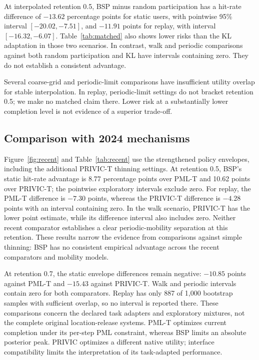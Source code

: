 \documentclass[3p,times]{elsarticle}
\begin{document}
At interpolated retention 0.5, BSP minus random participation has a hit-rate difference of $-13.62$ percentage points for static users, with pointwise 95\% interval $[-20.02,-7.51]$, and $-11.91$ points for replay, with interval $[-16.32,-6.07]$. Table~\ref{tab:matched} also shows lower risks than the KL adaptation in those two scenarios. In contrast, walk and periodic comparisons against both random participation and KL have intervals containing zero. They do not establish a consistent advantage.

Several coarse-grid and periodic-limit comparisons have insufficient utility overlap for stable interpolation. In replay, periodic-limit settings do not bracket retention 0.5; we make no matched claim there. Lower risk at a substantially lower completion level is not evidence of a superior trade-off.

\begin{table}[tbp]
\centering\small
\caption{Exploratory interpolation at retention 0.5. Hit rates and differences are in percentage points. Paired cluster-bootstrap intervals are pointwise. All displayed comparisons have 1,000 valid overlapping resamples.}
\label{tab:matched}
\end{table}

\subsection{Comparison with 2024 mechanisms}
Figure~\ref{fig:recent} and Table~\ref{tab:recent} use the strengthened policy envelopes, including the additional PRIVIC-T thinning settings. At retention 0.5, BSP's static hit-rate advantage is 8.77 percentage points over PML-T and 10.62 points over PRIVIC-T; the pointwise exploratory intervals exclude zero. For replay, the PML-T difference is $-7.30$ points, whereas the PRIVIC-T difference is $-4.28$ points with an interval containing zero. In the walk scenario, PRIVIC-T has the lower point estimate, while its difference interval also includes zero. Neither recent comparator establishes a clear periodic-mobility separation at this retention. These results narrow the evidence from comparisons against simple thinning: BSP has no consistent empirical advantage across the recent comparators and mobility models.

At retention 0.7, the static envelope differences remain negative: $-10.85$ points against PML-T and $-15.43$ against PRIVIC-T. Walk and periodic intervals contain zero for both comparators. Replay has only 887 of 1,000 bootstrap samples with sufficient overlap, so no interval is reported there. These comparisons concern the declared task adapters and exploratory mixtures, not the complete original location-release systems. PML-T optimizes current completion under its per-step PML constraint, whereas BSP limits an absolute posterior peak. PRIVIC optimizes a different native utility; interface compatibility limits the interpretation of its task-adapted performance.
\end{document}
